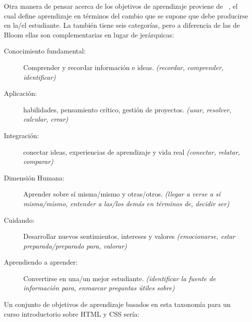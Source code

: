 Otra manera de pensar acerca de los objetivos de aprendizaje proviene de ~\cite{Fink2013},
el cual define aprendizaje en términos del cambio que se supone que debe producirse en la/el estudiante.
La  también tiene seis categorías,
pero a diferencia de las de Bloom ellas son complementarias en lugar de jerárquicas:
 
\begin{description}
 
\item[Conocimiento fundamental:]
  Comprender y recordar información e ideas.
  \emph{(recordar, comprender, identificar)}
 
\item[Aplicación:]
  habilidades, pensamiento crítico, gestión de proyectos.
  \emph{(usar, resolver, calcular, crear)}
 
\item[Integración:]
  conectar ideas, experiencias de aprendizaje y vida real
  \emph{(conectar, relatar, comparar)}
 
\item[Dimensión Humana:]
  Aprender sobre sí misma/mismo y otras/otros.
  \emph{(llegar a verse a sí misma/mismo, entender a las/los demás en términos de, decidir ser)}
 
\item[Cuidando:]
  Desarrollar nuevos sentimientos, intereses y valores
  \emph{(emocionarse, estar preparada/preparado para, valorar)}
 
\item[Aprendiendo a aprender:]
  Convertirse en una/un mejor estudiante.
  \emph{(identificar la fuente de información para, enmarcar preguntas útiles sobre)}
 
\end{description}
 
Un conjunto de objetivos de aprendizaje basados en esta taxonomía para un curso introductorio sobre HTML y CSS sería:
 
